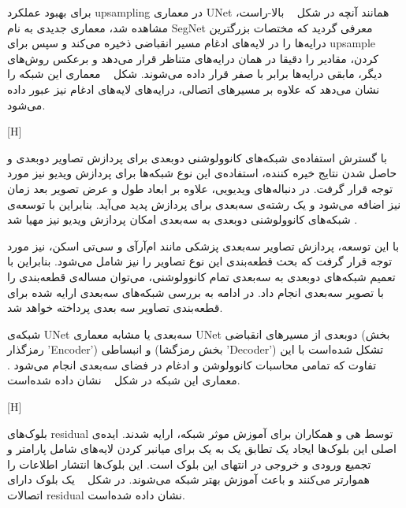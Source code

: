 برای بهبود عملکرد upsampling در معماری UNet همانند آنچه در شکل ~ بالا-راست، مشاهده شد، معماری جدیدی به نام SegNet معرفی گردید  که مختصات بزرگترین درایه‌ها را در لایه‌های ادغام مسیر انقباضی ذخیره می‌کند و سپس برای upsample کردن، مقادیر را دقیقا در همان درایه‌های متناظر قرار می‌دهد و برعکس روش‌های دیگر، مابقی درایه‌ها برابر با صفر قرار داده می‌شوند. شکل ~ معماری این شبکه را نشان می‌دهد که علاوه بر مسیرهای اتصالی، درایه‌های لایه‌های ادغام نیز عبور داده می‌شود.

[H]

با گسترش استفاده‌ی شبکه‌های کانوولوشنی دوبعدی برای پردازش تصاویر دوبعدی و حاصل شدن نتایج خیره کننده، استفاده‌ی این نوع شبکه‌ها برای پردازش ویدیو نیز مورد توجه قرار گرفت. در دنباله‌های ویدیویی، علاوه بر ابعاد طول و عرض تصویر بعد زمان نیز اضافه می‌شود و یک رشته‌ی سه‌بعدی برای پردازش پدید می‌آید. بنابراین با توسعه‌ی شبکه‌های کانوولوشنی دو‌بعدی به سه‌بعدی امکان پردازش ویدیو نیز مهیا شد .

با این توسعه، پردازش تصاویر سه‌بعدی پزشکی مانند ام‌آرآی و سی‌تی اسکن، نیز مورد توجه قرار گرفت که بحث قطعه‌بندی این نوع تصاویر را نیز شامل می‌شود. بنابراین با تعمیم شبکه‌های دوبعدی به سه‌بعدی تمام کانوولوشنی، می‌توان مساله‌ی قطعه‌بندی را با تصویر سه‌بعدی انجام داد. در ادامه به بررسی شبکه‌های سه‌بعدی ارایه شده برای قطعه‌بندی تصاویر سه بعدی پرداخته خواهد شد.

شبکه‌ی UNet سه‌بعدی یا  مشابه معماری UNet دوبعدی از مسیر‌های انقباضی (بخش رمزگذار 'Encoder') و انبساطی (بخش رمزگشا 'Decoder') تشکل‌ شده‌است با این تفاوت که تمامی محاسبات کانوولوشن و ادغام در فضای سه‌بعدی انجام می‌شود . معماری این شبکه در شکل ~ نشان داده شده‌است.

[H]

بلوک‌های residual توسط هی و همکاران  برای آموزش موثر شبکه، ارایه شدند. ایده‌ی اصلی این بلوک‌ها ایجاد یک تطابق یک‌ به یک برای میانبر کردن لایه‌های شامل پارامتر و تجمیع ورودی و خروجی در انتهای این بلوک است. این بلوک‌ها انتشار اطلاعات را هموارتر می‌کنند و باعث آموزش بهتر شبکه می‌شوند. در شکل ~ یک بلوک دارای اتصالات residual نشان داده شده‌است.

